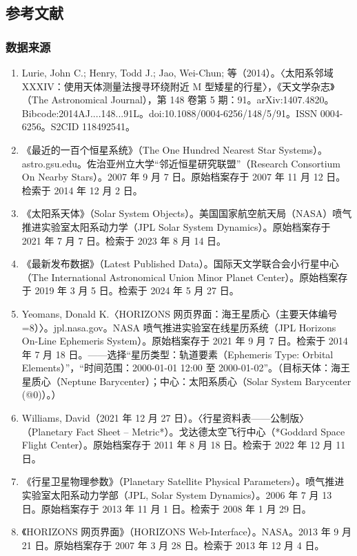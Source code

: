 \subsection{参考文献}
\subsubsection{数据来源}
\begin{enumerate}
\item Lurie, John C.; Henry, Todd J.; Jao, Wei-Chun; 等（2014）。〈太阳系邻域 XXXIV：使用天体测量法搜寻环绕附近 M 型矮星的行星〉，《天文学杂志》（The Astronomical Journal），第 148 卷第 5 期：91。arXiv:1407.4820。Bibcode:2014AJ....148...91L。doi:10.1088/0004-6256/148/5/91。ISSN 0004-6256。S2CID 118492541。
\item 《最近的一百个恒星系统》（The One Hundred Nearest Star Systems）。astro.gsu.edu。佐治亚州立大学“邻近恒星研究联盟”（Research Consortium On Nearby Stars）。2007 年 9 月 7 日。原始档案存于 2007 年 11 月 12 日。检索于 2014 年 12 月 2 日。
\item 《太阳系天体》（Solar System Objects）。美国国家航空航天局（NASA）喷气推进实验室太阳系动力学（JPL Solar System Dynamics）。原始档案存于 2021 年 7 月 7 日。检索于 2023 年 8 月 14 日。
\item 《最新发布数据》（Latest Published Data）。国际天文学联合会小行星中心（The International Astronomical Union Minor Planet Center）。原始档案存于 2019 年 3 月 5 日。检索于 2024 年 5 月 27 日。
\item Yeomans, Donald K.〈HORIZONS 网页界面：海王星质心（主要天体编号=8）〉。jpl.nasa.gov。NASA 喷气推进实验室在线星历系统（JPL Horizons On-Line Ephemeris System）。原始档案存于 2021 年 9 月 7 日。检索于 2014 年 7 月 18 日。——选择“星历类型：轨道要素（Ephemeris Type: Orbital Elements）”，“时间范围：2000-01-01 12:00 至 2000-01-02”。（目标天体：海王星质心（Neptune Barycenter）；中心：太阳系质心（Solar System Barycenter (@0)）。）
\item Williams, David（2021 年 12 月 27 日）。〈行星资料表——公制版〉（Planetary Fact Sheet – Metric*）。戈达德太空飞行中心（*Goddard Space Flight Center）。原始档案存于 2011 年 8 月 18 日。检索于 2022 年 12 月 11 日。
\item 《行星卫星物理参数》（Planetary Satellite Physical Parameters）。喷气推进实验室太阳系动力学部（JPL, Solar System Dynamics）。2006 年 7 月 13 日。原始档案存于 2013 年 11 月 1 日。检索于 2008 年 1 月 29 日。
\item 《HORIZONS 网页界面》（HORIZONS Web-Interface）。NASA。2013 年 9 月 21 日。原始档案存于 2007 年 3 月 28 日。检索于 2013 年 12 月 4 日。

\end{enumerate}
